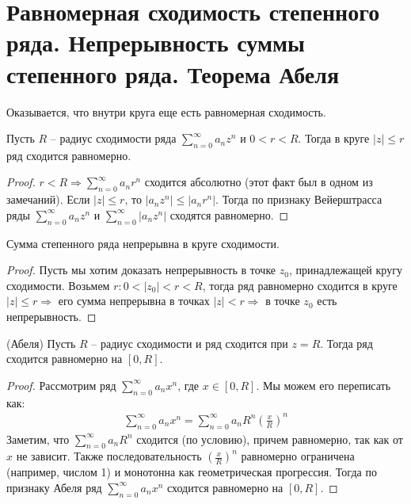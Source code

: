 \section{Равномерная сходимость степенного ряда. Непрерывность суммы степенного ряда. Теорема Абеля}
Оказывается, что внутри круга еще есть равномерная сходимость.

\begin{theorem}
    Пусть $R$ -- радиус сходимости ряда $\sum\limits_{n=0}^\infty a_nz^n$ и $0 < r < R$. 
    Тогда в круге $|z| \leqslant r$ ряд сходится равномерно.
\end{theorem}
\begin{proof}
    $r < R \Rightarrow \sum\limits_{n=0}^\infty a_nr^n$ сходится абсолютно (этот факт был в одном из замечаний).
    Если $|z| \leqslant r$, то $|a_nz^n| \leqslant |a_nr^n|$. 
    Тогда по признаку Вейерштрасса ряды $\sum\limits_{n=0}^\infty a_nz^n$ и $\sum\limits_{n=0}^\infty |a_nz^n|$ сходятся равномерно.
\end{proof}
\begin{follow}
    Сумма степенного ряда непрерывна в круге сходимости.
\end{follow}
\begin{proof}
    Пусть мы хотим доказать непрерывность в точке $z_0$, принадлежащей кругу сходимости.
    Возьмем $r: 0 < |z_0| < r < R$, тогда ряд равномерно сходится в круге $|z| \leqslant r \Rightarrow$ его сумма непрерывна в точках $|z| < r \Rightarrow$ в точке $z_0$ есть непрерывность.
\end{proof}

\begin{theorem} (Абеля) \;
    Пусть $R$ -- радиус сходимости и ряд сходится при $z = R$. 
    Тогда ряд сходится равномерно на $[0, R]$.
\end{theorem}
\begin{proof}
    Рассмотрим ряд $\sum\limits_{n = 0}^\infty a_n x^n$, где $x \in [0, R]$.
    Мы можем его переписать как:
    \begin{gather*}
        \sum\limits_{n = 0}^\infty a_n x^n = \sum\limits_{n = 0}^\infty a_n R^n (\frac{x}{R})^n
    \end{gather*}
    Заметим, что $\sum\limits_{n = 0}^\infty a_n R^n$ сходится (по условию), причем равномерно, так как от $x$ не зависит. 
    Также последовательность $(\frac{x}{R})^n$ равномерно ограничена (например, числом 1) и монотонна как геометрическая прогрессия. 
    Тогда по признаку Абеля ряд $\sum\limits_{n = 0}^\infty a_n x^n$ сходится равномерно на $[0, R]$.
\end{proof}

